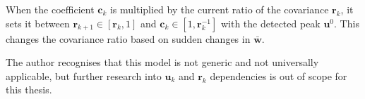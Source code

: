 \documentclass[class=article, crop=false]{standalone}
\begin{document}
\vspace{0.5cm}

When the coefficient $ \textbf{c}_k $ is  multiplied by the current ratio of the covariance $ \textbf{r}_k $, it sets it between $ \textbf{r}_{k+1} \in [\textbf{r}_k,1] $ and $ \textbf{c}_k \in [1, \textbf{r}^{-1}_{k}] $ with the detected peak $ \textbf{u}^0 $. This changes the covariance ratio based on sudden changes in $ \bar{\textbf{w}} $.

The author recognises that this model is not generic and not universally applicable, but further research into $ \textbf{u}_k $ and $ \textbf{r}_{k} $ dependencies is out of scope for this thesis.
\end{document}
